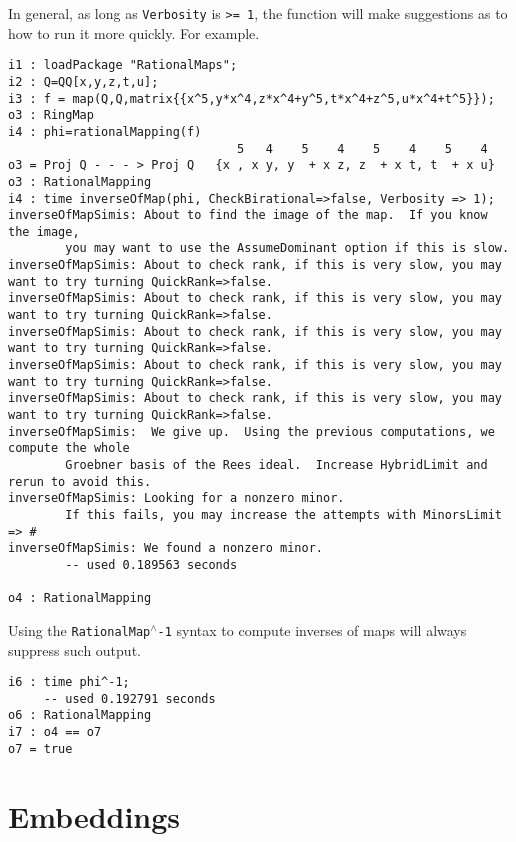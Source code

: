 \documentclass[11pt]{amsart}%
\numberwithin{equation}{theorem}
\renewcommand{\:}{\colon}
\theoremstyle{theorem}
\begin{document}
 In general, as long as {\tt Verbosity} is {\tt >= 1}, the function will make suggestions as to how to run it more quickly.  For example.  
{
{\scriptsize\color{blue}
\begin{verbatim}
i1 : loadPackage "RationalMaps";
i2 : Q=QQ[x,y,z,t,u];
i3 : f = map(Q,Q,matrix{{x^5,y*x^4,z*x^4+y^5,t*x^4+z^5,u*x^4+t^5}});
o3 : RingMap
i4 : phi=rationalMapping(f)
                                5   4    5    4    5    4    5    4
o3 = Proj Q - - - > Proj Q   {x , x y, y  + x z, z  + x t, t  + x u}
o3 : RationalMapping
i4 : time inverseOfMap(phi, CheckBirational=>false, Verbosity => 1);
inverseOfMapSimis: About to find the image of the map.  If you know the image,
        you may want to use the AssumeDominant option if this is slow.
inverseOfMapSimis: About to check rank, if this is very slow, you may want to try turning QuickRank=>false.
inverseOfMapSimis: About to check rank, if this is very slow, you may want to try turning QuickRank=>false.
inverseOfMapSimis: About to check rank, if this is very slow, you may want to try turning QuickRank=>false.
inverseOfMapSimis: About to check rank, if this is very slow, you may want to try turning QuickRank=>false.
inverseOfMapSimis: About to check rank, if this is very slow, you may want to try turning QuickRank=>false.
inverseOfMapSimis:  We give up.  Using the previous computations, we compute the whole
        Groebner basis of the Rees ideal.  Increase HybridLimit and rerun to avoid this.
inverseOfMapSimis: Looking for a nonzero minor.
        If this fails, you may increase the attempts with MinorsLimit => #
inverseOfMapSimis: We found a nonzero minor.
        -- used 0.189563 seconds                                                                     

o4 : RationalMapping
\end{verbatim}
}
Using the {\tt RationalMap{{${}^\wedge$}}-1} syntax to compute inverses of maps will always suppress such output.
{\scriptsize\color{blue}
\begin{verbatim}
i6 : time phi^-1;
     -- used 0.192791 seconds                                                                     
o6 : RationalMapping
i7 : o4 == o7
o7 = true
\end{verbatim}
}
{\color{black}\normalsize
\section{Embeddings}

}}
\end{document}
